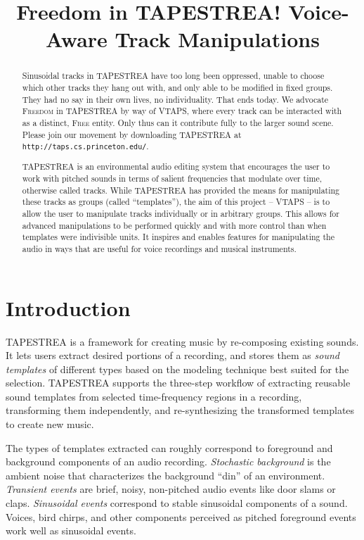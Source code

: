 \documentclass{article}
\title{Freedom in TAPESTREA! Voice-Aware Track Manipulations}
\newcommand{\noun}[1]{\textsc{#1}}
\begin{document}
\maketitle

\begin{abstract}
Sinusoidal tracks in TAPESTREA have too long been oppressed, unable to choose which other
tracks they hang out with, and only able to be modified in fixed groups. They
had no say in their own lives, no individuality. That ends today. We advocate
\noun{Freedom} in TAPESTREA by way of VTAPS, where every track can be
interacted with as a distinct, \noun{Free} entity. Only thus can it contribute
fully to the larger sound scene. Please join our movement by downloading
TAPESTREA at \\
{\tt \small http://taps.cs.princeton.edu/}.

TAPESTREA is an environmental audio editing system that encourages the user to
work with pitched sounds in terms of salient frequencies that modulate over
time, otherwise called tracks. While TAPESTREA has provided the means for
manipulating these tracks as groups (called ``templates''), the aim of this
project -- VTAPS -- is to allow the user to manipulate tracks individually or
in arbitrary groups.  This allows for advanced manipulations to be performed
quickly and with more control than when templates were indivisible units. It
inspires and enables features for manipulating the audio in ways that are
useful for voice recordings and musical instruments.
\end{abstract}

\section{Introduction}

TAPESTREA \cite{recompose} is a framework for creating music by re-composing 
existing sounds. It lets users extract desired portions of a recording, 
and stores them as {\it sound templates} of different types based on the modeling 
technique best suited for the selection. TAPESTREA supports the three-step 
workflow of extracting reusable sound templates from selected time-frequency 
regions in a recording, transforming them independently, and 
re-synthesizing the transformed templates to create new music.

The types of templates extracted can roughly correspond to foreground and 
background components of an audio recording. {\it Stochastic background} is the 
ambient noise that characterizes the background ``din'' of an environment. 
{\it Transient events} are brief, noisy, non-pitched audio events like door slams or 
claps. {\it Sinusoidal events} correspond to stable sinusoidal components of a sound. 
Voices, bird chirps, and other components perceived as pitched foreground events work 
well as sinusoidal events. 
\end{document}
